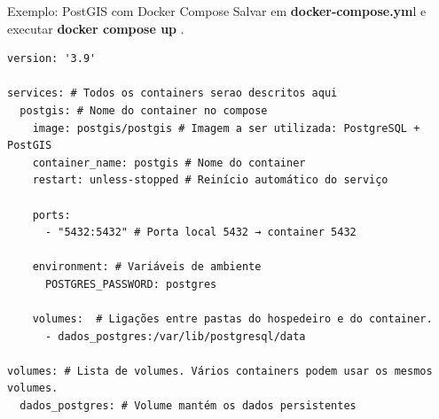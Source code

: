 \documentclass{beamer}
\begin{document}
\begin{frame}[fragile]{Exemplo: PostGIS com Docker Compose}
Salvar em \textbf{docker-compose.ym}l e executar \textbf{ docker compose up} .
\begin{verbatim}
version: '3.9'

services: # Todos os containers serao descritos aqui
  postgis: # Nome do container no compose
    image: postgis/postgis # Imagem a ser utilizada: PostgreSQL + PostGIS
    container_name: postgis # Nome do container
    restart: unless-stopped # Reinício automático do serviço

    ports:
      - "5432:5432" # Porta local 5432 → container 5432

    environment: # Variáveis de ambiente
      POSTGRES_PASSWORD: postgres

    volumes:  # Ligações entre pastas do hospedeiro e do container.
      - dados_postgres:/var/lib/postgresql/data

volumes: # Lista de volumes. Vários containers podem usar os mesmos volumes.
  dados_postgres: # Volume mantém os dados persistentes
\end{verbatim}

\vspace{0.3cm}

\end{frame}
\end{document}
